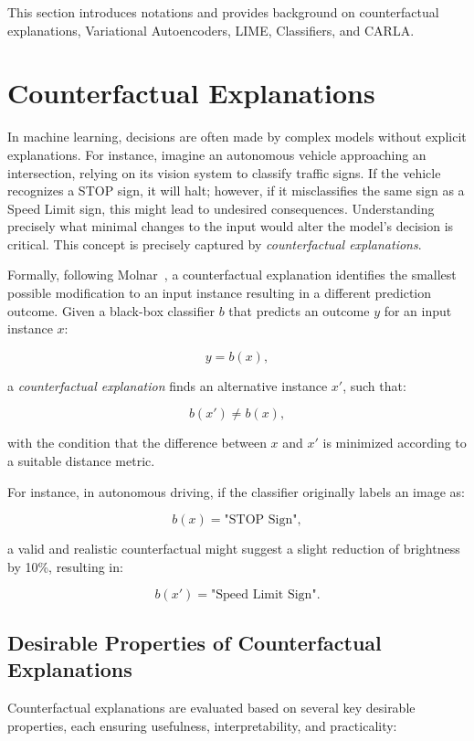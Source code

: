 This section introduces notations and provides background on counterfactual explanations, Variational Autoencoders, LIME, Classifiers, and CARLA.

\section{Counterfactual Explanations}
In machine learning, decisions are often made by complex models without explicit explanations. For instance, imagine an autonomous vehicle approaching an intersection, relying on its vision system to classify traffic signs. If the vehicle recognizes a STOP sign, it will halt; however, if it misclassifies the same sign as a Speed Limit sign, this might lead to undesired consequences. Understanding precisely what minimal changes to the input would alter the model's decision is critical. This concept is precisely captured by \textit{counterfactual explanations}.

Formally, following Molnar~\cite{molnar2025}, a counterfactual explanation identifies the smallest possible modification to an input instance resulting in a different prediction outcome. Given a black-box classifier \( b \) that predicts an outcome \( y \) for an input instance \( x \):

\begin{equation}
y = b(x),
\end{equation}

a \textit{counterfactual explanation} finds an alternative instance \( x' \), such that:

\begin{equation}
b(x') \neq b(x),
\end{equation}

with the condition that the difference between \( x \) and \( x' \) is minimized according to a suitable distance metric.

For instance, in autonomous driving, if the classifier originally labels an image as:

\begin{equation}
b(x) = \text{"STOP Sign"},
\end{equation}

a valid and realistic counterfactual might suggest a slight reduction of brightness by 10\%, resulting in:

\begin{equation}
b(x') = \text{"Speed Limit Sign"}.
\end{equation}

\subsection{Desirable Properties of Counterfactual Explanations}
Counterfactual explanations are evaluated based on several key desirable properties, each ensuring usefulness, interpretability, and practicality:

